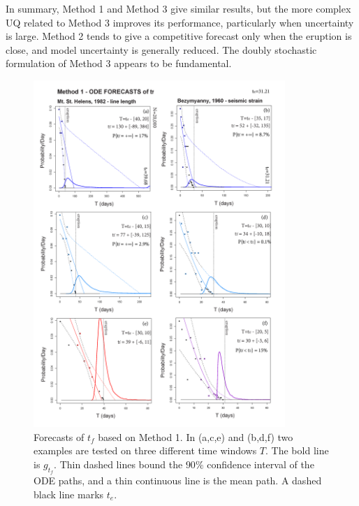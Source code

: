 \documentclass{article}
\begin{document}
In summary, Method 1 and Method 3 give similar results, but the more complex UQ related to Method 3 improves its performance, particularly when uncertainty is large. Method 2 tends to give a competitive forecast only when the eruption is close, and model uncertainty is generally reduced. The doubly stochastic formulation of Method 3 appears to be fundamental.

\begin{figure}[H]\vskip-0.5cm
\centering
\includegraphics[width=0.85\textwidth]{Fig13_new.png}
\caption{Forecasts of $t_f$ based on Method 1. In (a,c,e) and (b,d,f) two examples are tested on three different time windows $T$. The bold line is $g_{t_f}$. Thin dashed lines bound the $90\%$ confidence interval of the ODE paths, and a thin continuous line is the mean path. A dashed black line marks $t_e$.}
\label{Fig13}
\end{figure}
\end{document}
